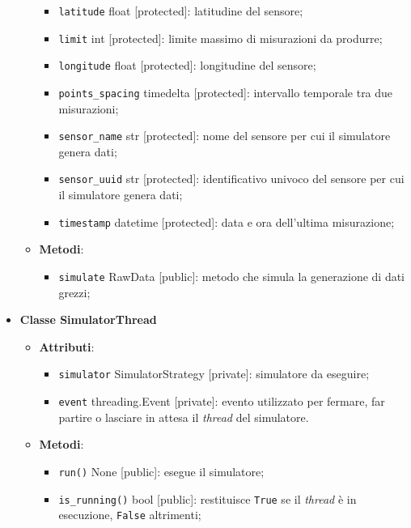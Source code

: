 \begin{itemize}
\begin{itemize}
\begin{itemize}
			            \item \texttt{latitude} float [protected]: latitudine del sensore;
			            \item \texttt{limit} int [protected]: limite massimo di misurazioni da produrre;
			            \item \texttt{longitude} float [protected]: longitudine del sensore;
			            \item \texttt{points\_spacing} timedelta [protected]: intervallo temporale tra due misurazioni;
			            \item \texttt{sensor\_name} str [protected]: nome del sensore per cui il simulatore genera dati;
			            \item \texttt{sensor\_uuid} str [protected]: identificativo univoco del sensore per cui il simulatore genera dati;
			            \item \texttt{timestamp} datetime [protected]: data e ora dell'ultima misurazione;
		            \end{itemize}
		      \item \textbf{Metodi}:
		            \begin{itemize}
			            \item \texttt{simulate} RawData [public]: metodo che simula la generazione di dati grezzi;
		            \end{itemize}
	      \end{itemize}
	\item \textbf{Classe SimulatorThread}
	      \begin{itemize}
		      \item \textbf{Attributi}:
		            \begin{itemize}
			            \item \texttt{simulator} SimulatorStrategy [private]: simulatore da eseguire;
			            \item \texttt{event} threading.Event [private]: evento utilizzato per fermare, far partire o lasciare in attesa il \textit{thread} del simulatore.
		            \end{itemize}
		      \item \textbf{Metodi}:
		            \begin{itemize}
			            \item \texttt{run()} None [public]: esegue il simulatore;
			            \item \texttt{is\_running()} bool [public]: restituisce \texttt{True} se il \textit{thread} è in esecuzione, \texttt{False} altrimenti;

\end{itemize}
\end{itemize}
\end{itemize}
